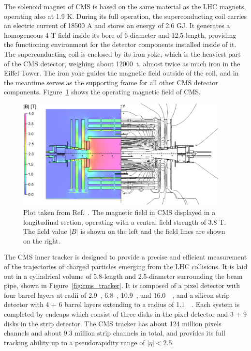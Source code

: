 The solenoid magnet of CMS is based on the same material as the LHC magnets, operating also at 1.9 K.
During its full operation, the superconducting coil carries an electric current of 18500 A and stores an energy of 2.6 GJ.
It generates a homogeneous 4 T field inside its bore of 6-\meter diameter and 12.5-\meter length,
providing the functioning environment for the detector components installed inside of it.
The superconducting coil is enclosed by its iron yoke, which is the heaviest part of the CMS detector, 
weighing about 12000~t, almost twice as much iron in the Eiffel Tower.
The iron yoke guides the magnetic field outside of the coil, and in the meantime serves as the supporting frame for all other CMS detector components.
Figure~\ref{fig:cms_field} shows the operating magnetic field of CMS.

\begin{figure}[!htb]
    \centering
    \captionsetup{justification=justified}
    \includegraphics[width=0.95\textwidth]{pics/LHC_CMS/CMS_field.png}
    \caption{Plot taken from Ref.~\cite{Collaboration_2010}. 
             The magnetic field in CMS displayed in a longitudinal section, operating with a central field strength of 3.8 T.
             The field value $|B|$ is shown on the left and the field lines are shown on the right.}
    \label{fig:cms_field}
\end{figure}


The CMS inner tracker is designed to provide a precise and efficient measurement of the trajectories of charged particles emerging from the LHC collisions.
It is laid out in a cylindrical volume of 5.8-\meter length and 2.5-\meter diameter surrounding the beam pipe, shown in Figure~\ref{fig:cms_tracker}.
It is composed of a pixel detector with four barrel layers at radii of 2.9~\cm, 6.8~\cm, 10.9~\cm, and 16.0~\cm~\cite{phase1_tracker},
and a silicon strip detector with 4 + 6 barrel layers extending to a radius of 1.1~\meter~\cite{Collaboration_2008}.
Each system is completed by endcaps which consist of three disks in the pixel detector and 3 + 9 disks in the strip detector.
The CMS tracker has about 124 million pixels channels and about 9.3 million strip channels in total,
and provides its full tracking ability up to a pseudorapidity range of $|\eta| < $2.5.

